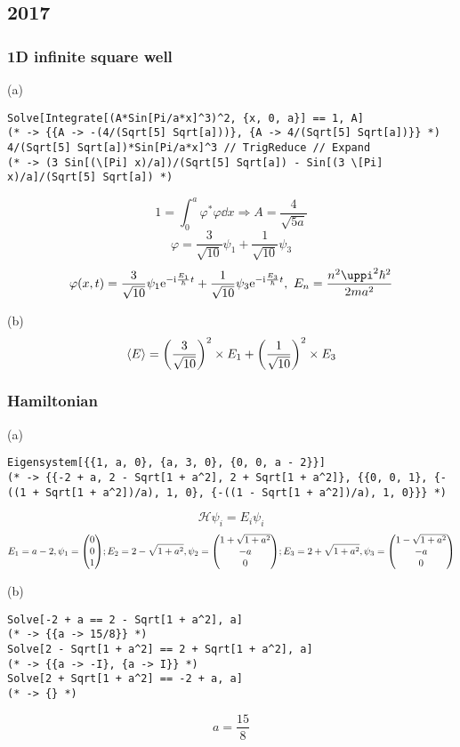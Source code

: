 \subsection{2017}

\subsubsection{1D infinite square well}

(a)
\begin{verbatim}
Solve[Integrate[(A*Sin[Pi/a*x]^3)^2, {x, 0, a}] == 1, A]
(* -> {{A -> -(4/(Sqrt[5] Sqrt[a]))}, {A -> 4/(Sqrt[5] Sqrt[a])}} *)
4/(Sqrt[5] Sqrt[a])*Sin[Pi/a*x]^3 // TrigReduce // Expand
(* -> (3 Sin[(\[Pi] x)/a])/(Sqrt[5] Sqrt[a]) - Sin[(3 \[Pi] x)/a]/(Sqrt[5] Sqrt[a]) *)
\end{verbatim}
\[
    1 = \int_0^a \varphi^* \varphi \dd{x} \Rightarrow A = \frac{4}{\sqrt{5 a}}
\] \[
    \varphi = \frac{3}{\sqrt{10}} \psi_1 + \frac{1}{\sqrt{10}} \psi_3
\] \[
    \varphi(x, t) = \frac{3}{\sqrt{10}} \psi_1 \rme^{- \rmi \frac{E_1}{\hbar} t} + \frac{1}{\sqrt{10}} \psi_3 \rme^{- \rmi \frac{E_3}{\hbar} t},\ E_n = \frac{n^2 \uppi^2 \hbar^2}{2 m a^2}
\]

(b)
\[
    \expval{E} = \qty(\frac{3}{\sqrt{10}})^2 \times E_1 + \qty(\frac{1}{\sqrt{10}})^2 \times E_3
\]

\subsubsection{Hamiltonian}

(a)
\begin{verbatim}
Eigensystem[{{1, a, 0}, {a, 3, 0}, {0, 0, a - 2}}]
(* -> {{-2 + a, 2 - Sqrt[1 + a^2], 2 + Sqrt[1 + a^2]}, {{0, 0, 1}, {-((1 + Sqrt[1 + a^2])/a), 1, 0}, {-((1 - Sqrt[1 + a^2])/a), 1, 0}}} *)
\end{verbatim}
\[
    \mathcal{H} \psi_i = E_i \psi_i
\] \[
    E_1 = a - 2, \psi_1 = \mqty(0 \\ 0 \\ 1); E_2 = 2 - \sqrt{1 + a^2}, \psi_2 = \mqty(1 + \sqrt{1 + a^2} \\ - a \\ 0); E_3 = 2 + \sqrt{1 + a^2}, \psi_3 = \mqty(1 - \sqrt{1 + a^2} \\ - a \\ 0)
\]

(b)
\begin{verbatim}
Solve[-2 + a == 2 - Sqrt[1 + a^2], a]
(* -> {{a -> 15/8}} *)
Solve[2 - Sqrt[1 + a^2] == 2 + Sqrt[1 + a^2], a]
(* -> {{a -> -I}, {a -> I}} *)
Solve[2 + Sqrt[1 + a^2] == -2 + a, a]
(* -> {} *)
\end{verbatim}
\[
    a = \frac{15}{8}
\]

